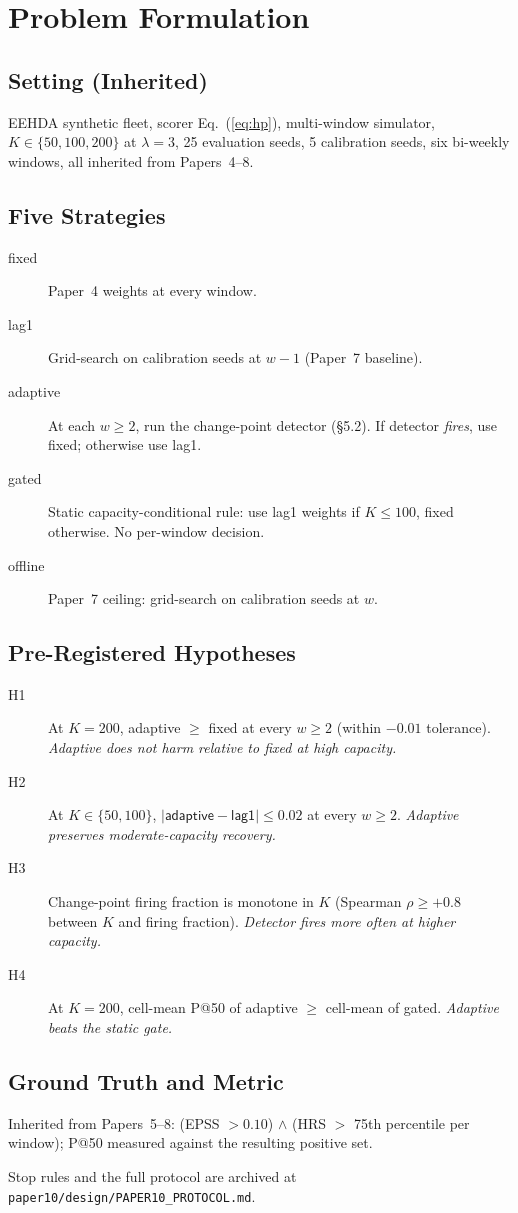 \section{Problem Formulation}
\label{sec:problem}

\subsection{Setting (Inherited)}

EEHDA synthetic fleet, scorer Eq.~(\ref{eq:hp}), multi-window
simulator, $K \in \{50, 100, 200\}$ at $\lambda = 3$, 25 evaluation
seeds, 5 calibration seeds, six bi-weekly windows, all inherited from
Papers~4--8.

\subsection{Five Strategies}

\begin{description}
\item[\textsf{fixed}] Paper~4 weights at every window.
\item[\textsf{lag1}] Grid-search on calibration seeds at $w - 1$
(Paper~7 baseline).
\item[\textsf{adaptive}] At each $w \geq 2$, run the change-point
detector (\S5.2). If detector \textit{fires}, use \textsf{fixed};
otherwise use \textsf{lag1}.
\item[\textsf{gated}] Static capacity-conditional rule: use
\textsf{lag1} weights if $K \leq 100$, \textsf{fixed} otherwise. No
per-window decision.
\item[\textsf{offline}] Paper~7 ceiling: grid-search on calibration
seeds at $w$.
\end{description}

\subsection{Pre-Registered Hypotheses}

\begin{description}
\item[H1] At $K = 200$, \textsf{adaptive} $\geq$ \textsf{fixed} at
every $w \geq 2$ (within $-0.01$ tolerance). \textit{Adaptive does
not harm relative to fixed at high capacity.}
\item[H2] At $K \in \{50, 100\}$, $|\textsf{adaptive} - \textsf{lag1}|
\leq 0.02$ at every $w \geq 2$. \textit{Adaptive preserves
moderate-capacity recovery.}
\item[H3] Change-point firing fraction is monotone in $K$ (Spearman
$\rho \geq +0.8$ between $K$ and firing fraction). \textit{Detector
fires more often at higher capacity.}
\item[H4] At $K = 200$, cell-mean P@50 of \textsf{adaptive} $\geq$
cell-mean of \textsf{gated}. \textit{Adaptive beats the static gate.}
\end{description}

\subsection{Ground Truth and Metric}

Inherited from Papers~5--8: (EPSS $> 0.10$) $\wedge$ (HRS $>$ 75th
percentile per window); P@50 measured against the resulting positive
set.

Stop rules and the full protocol are archived at
\texttt{paper10/design/PAPER10\_PROTOCOL.md}.
